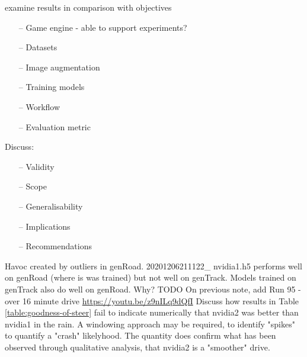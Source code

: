 examine results in comparison with objectives
\begin{itemize}
    \item[--] Game engine - able to support experiments?
    \item[--] Datasets
    \item[--] Image augmentation
    \item[--] Training models
    \item[--] Workflow
    \item[--] Evaluation metric
\end{itemize}
Discuss:
\begin{itemize}
    \item[--] Validity
    \item[--] Scope
    \item[--] Generalisability
    \item[--] Implications
    \item[--] Recommendations
\end{itemize}
Havoc created by outliers in genRoad. 20201206211122\_ nvidia1.h5 performs well on genRoad (where is was trained) but not well on genTrack. Models trained on genTrack also do well on genRoad. Why?
TODO On previous note, add Run 95 - over 16 minute drive \url{https://youtu.be/z9nILq9dQfI}  
Discuss how results in Table \ref{table:goodness-of-steer} fail to indicate numerically that nvidia2 was better than nvidia1 in the rain. A windowing approach may be required, to identify "spikes" to quantify a "crash" likelyhood. The quantity does confirm what has been observed through qualitative analysis, that nvidia2 is a "smoother" drive.